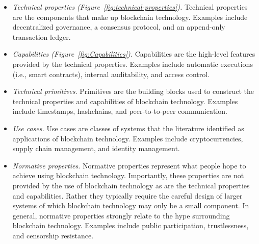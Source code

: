 \begin{itemize}
	\item \emph{Technical properties (Figure~\ref{fig:technical-properties}).}
	Technical properties are the components that make up blockchain technology. 
	Examples include decentralized governance, a consensus protocol, and an 
	append-only transaction ledger.
	
	\item \emph{Capabilities (Figure~\ref{fig:Capabilities}).}
	Capabilities are the high-level features provided by the technical 
	properties. Examples include automatic executions (i.e., smart contracts), 
	internal auditability, and access control.
	
	\item \emph{Technical primitives.}
	Primitives are the building blocks used to construct the technical properties and capabilities of blockchain technology. Examples include timestamps, hashchains, and peer-to-to-peer communication.
	
	\item \emph{Use cases.}
	Use cases are classes of systems that the literature identified as 
	applications of blockchain technology. Examples include cryptocurrencies, 
	supply chain management, and identity management.
	
	\item \emph{Normative properties.} 
	Normative properties represent what people hope to achieve using blockchain technology. 
	Importantly, these properties are not provided by the use of blockchain 
	technology as are the technical properties and capabilities. Rather they 
	typically require the careful design of larger systems of which blockchain 
	technology may only be a small component.
	In general, normative properties strongly relate to the hype surrounding blockchain technology. Examples include public participation, trustlessness, and censorship resistance.
	
\end{itemize}

